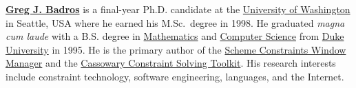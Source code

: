 \documentclass{article}
\begin{document}
\begin{multicols}{2}
\textbf{\href{http://www.cs.washington.edu/homes/gjb}{Greg J. Badros}}
is a final-year Ph.D. candidate at the
\href{http://www.cs.washington.edu}{University of Washington} 
in Seattle, USA where he earned his M.Sc.\  degree in 1998.  
He graduated \textit{magna cum laude} with a B.S.
degree in \href{http://www.math.duke.edu}{Mathematics} and 
\href{http://www.cs.duke.edu}{Computer Science} from
\href{http://www.duke.edu}{Duke University} in 1995.  He is the 
primary author of the 
\href{http://scwm.mit.edu}{Scheme Constraints Window Manager} and the 
\href{http://www.cs.washington.edu/research/constraints/cassowary}{Cassowary
Constraint Solving Toolkit}.  His research interests include
constraint technology, software engineering, languages, and the
Internet.

\end{multicols}
\end{document}
